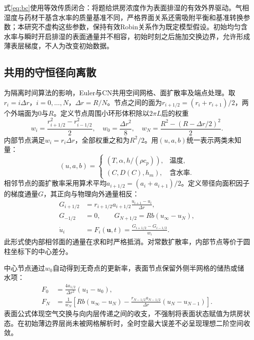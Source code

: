 \documentclass[UTF8,a4paper,11pt]{ctexart}
\begin{document}
式\eqref{eq:bc}使用等效传质闭合：将题给烘房浓度作为表面排湿的有效外界驱动。气相湿度与药材干基含水率的质量基准不同，严格界面关系还需吸附平衡和基准转换参数；本研究不虚构这些参数，保持有效Robin关系作为既定模型假设。初始均匀含水率与瞬时开启排湿的表面通量并不相容，初始时刻之后施加交换边界，允许形成薄表层梯度，不人为改变初始数据。

\subsection{共用的守恒径向离散}
为隔离时间算法的影响，Euler与CN共用空间网格、面扩散率及端点处理。取$r_i=i\Delta r$，$i=0,\ldots,N$，$\Delta r=R/N$。节点之间的面为$r_{i+1/2}=(r_i+r_{i+1})/2$，两个外端面为0与$R$。定义节点周围小环形体积除以$2\pi L$后的权重
\begin{equation}
 w_i=\frac{r_{i+1/2}^2-r_{i-1/2}^2}{2},\quad
 w_0=\frac{\Delta r^2}{8},\quad
 w_N=\frac{R^2-(R-\Delta r/2)^2}{2}.
\end{equation}
内部节点满足$w_i=r_i\Delta r$，全部权重之和为$R^2/2$。用$(u,a,b)$统一表示两类未知量：
\begin{equation}
 (u,a,b)=\begin{cases}
 (T,\alpha,h/(\rho c_p)),&\text{温度},\\
 (C,D(C),h_m),&\text{含水率}.
 \end{cases}
\end{equation}
相邻节点的面扩散率采用算术平均$a_{i+1/2}=(a_i+a_{i+1})/2$。定义带径向面积因子的梯度通量$G$，其正向与物理向外通量相反：
\begin{align}
 G_{i+1/2}&=r_{i+1/2}a_{i+1/2}\frac{u_{i+1}-u_i}{\Delta r},\\
 G_{-1/2}&=0,\qquad G_{N+1/2}=Rb(u_\infty-u_N),\\
 \dot u_i&=F_i(\boldsymbol u,t)=\frac{G_{i+1/2}-G_{i-1/2}}{w_i}.\label{eq:semidiscrete}
\end{align}
此形式使内部相邻面的通量在求和时严格抵消。对常数扩散率，内部节点等价于圆柱坐标下的中心差分。

中心节点通过$w_0$自动得到无奇点的更新率，表面节点保留外侧半网格的储热或储水项：
\begin{align}
 F_0&=\frac{4a_{1/2}}{\Delta r^2}(u_1-u_0),\\
 F_N&=\frac{1}{w_N}\left[Rb(u_\infty-u_N)-
 \frac{r_{N-1/2}a_{N-1/2}}{\Delta r}(u_N-u_{N-1})\right].
\end{align}
表面公式体现空气交换与向内层传递之间的收支，不强制将表面状态赋值为烘房状态。在初始薄边界层尚未被网格解析时，全时空最大误差不必呈现理想二阶空间收敛。
\end{document}
